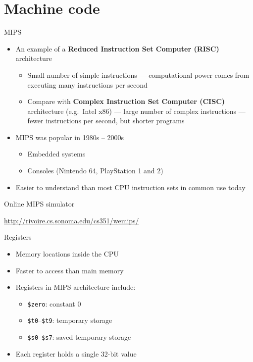\part{Machine code}
\frame{\partpage}

\begin{frame}{MIPS}
	\begin{itemize}
		\pause\item An example of a \textbf{Reduced Instruction Set Computer (RISC)} architecture
			\begin{itemize}
				\pause\item Small number of simple instructions --- computational power comes from executing
					many instructions per second
				\pause\item Compare with \textbf{Complex Instruction Set Computer (CISC)} architecture (e.g.\ Intel x86)
					--- large number of complex instructions
					--- fewer instructions per second, but shorter programs
			\end{itemize}
		\pause\item MIPS was popular in 1980s -- 2000s
			\begin{itemize}
				\pause\item Embedded systems
				\pause\item Consoles (Nintendo 64, PlayStation 1 and 2)
			\end{itemize}
		\pause\item Easier to understand than most CPU instruction sets in common use today
	\end{itemize}
\end{frame}

\begin{frame}{Online MIPS simulator}
	\begin{center}
		\url{http://rivoire.cs.sonoma.edu/cs351/wemips/}
	\end{center}
\end{frame}

\begin{frame}{Registers}
	\begin{itemize}
		\pause\item Memory locations inside the CPU
		\pause\item Faster to access than main memory
		\pause\item Registers in MIPS architecture include:
			\begin{itemize}
				\pause\item \lstinline{$zero}: constant 0
				\pause\item \lstinline{$t0}--\lstinline{$t9}: temporary storage
				\pause\item \lstinline{$s0}--\lstinline{$s7}: saved temporary storage
			\end{itemize}
		\pause\item Each register holds a single 32-bit value
	\end{itemize}
\end{frame}

